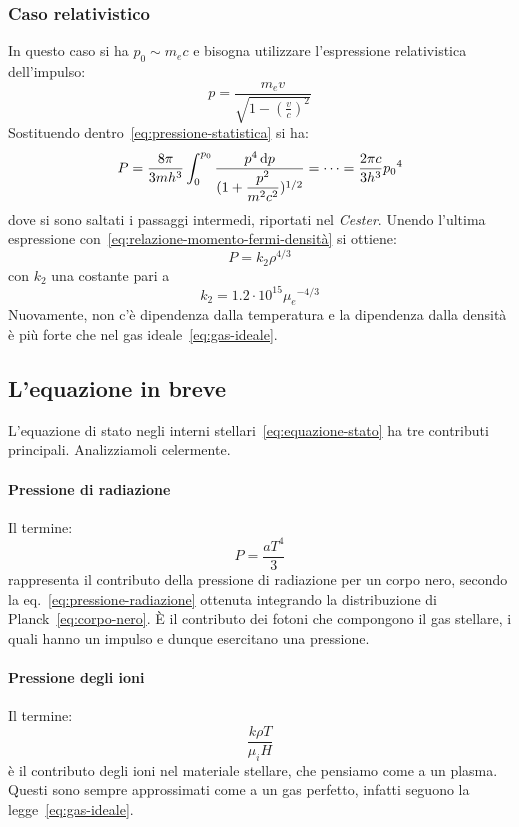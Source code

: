 \subsubsection{Caso relativistico}
In questo caso si ha $p_0 \sim m_e c$ e bisogna utilizzare l'espressione relativistica dell'impulso:
\[
p= \dfrac{m_e v}{\sqrt{1- (\frac{v}{c})^2}}
\]
Sostituendo dentro~\eqref{eq:pressione-statistica} si ha:
\[
P = \dfrac{8\pi}{3mh^3} \int_0^{p_0} \dfrac{p^4 \mathop{\mathrm{{}d}}\mathopen{} p}{(1 + \dfrac{p^2}{m^2c^2})^{1/2}} = \dots = \dfrac{2\pi c}{3h^3}{p_0}^4
\]
dove si sono saltati i passaggi intermedi, riportati nel \emph{Cester}. Unendo l'ultima espressione con~\eqref{eq:relazione-momento-fermi-densità} si ottiene:
\begin{equation}\label{eq:pressione-degenerazione-relativistica}
    P = k_2 \rho^{4/3}
\end{equation}
con $k_2$ una costante pari a
\[
k_2 = 1.2 \cdot 10^{15} {\mu_e}^{-4/3}
\]
Nuovamente, non c'è dipendenza dalla temperatura e la dipendenza dalla densità è più forte che nel gas ideale~\eqref{eq:gas-ideale}.

\subsection{L'equazione in breve}
L'equazione di stato negli interni stellari~\eqref{eq:equazione-stato} ha tre contributi principali. Analizziamoli celermente.

\paragraph{Pressione di radiazione}
Il termine:
\[
P = \dfrac{aT^4}{3}
\]
rappresenta il contributo della pressione di radiazione per un corpo nero, secondo la eq.~\eqref{eq:pressione-radiazione} ottenuta integrando la distribuzione di Planck~\ref{eq:corpo-nero}. È il contributo dei fotoni che compongono il gas stellare, i quali hanno un impulso e dunque esercitano una pressione.

\paragraph{Pressione degli ioni}
Il termine:
\[
\dfrac{k \rho T}{\mu_i H}
\]
è il contributo degli ioni nel materiale stellare, che pensiamo come a un plasma. Questi sono sempre approssimati come a un gas perfetto, infatti seguono la legge~\eqref{eq:gas-ideale}.

